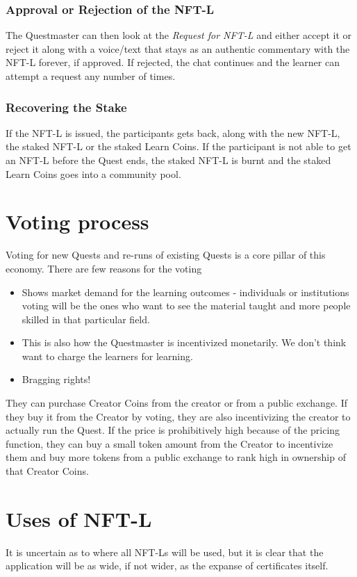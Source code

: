 \documentclass{article}
\begin{document}
        \subsubsection{Approval or Rejection of the NFT-L}
          The Questmaster can then look at the \textit{Request for NFT-L} and either accept it or reject it along with a voice/text that stays as an authentic commentary with the NFT-L forever, if approved. 
          If rejected, the chat continues and the learner can attempt a request any number of times.
        \subsubsection{Recovering the Stake}
          If the NFT-L is issued, the participants gets back, along with the new NFT-L, the staked NFT-L or the staked Learn Coins.
          \break
          If the participant is not able to get an NFT-L before the Quest ends, the staked NFT-L is burnt and the staked Learn Coins goes into a community pool.
  \section{Voting process}
    Voting for new Quests and re-runs of existing Quests is a core pillar of this economy. 
    There are few reasons for the voting
    \begin{itemize}
      \item Shows market demand for the learning outcomes - individuals or institutions voting will be the ones who want to see the material taught and more people skilled in that particular field.
      \item This is also how the Questmaster is incentivized monetarily. We don't think want to charge the learners for learning.
      \item Bragging rights!
    \end{itemize}
    They can purchase Creator Coins from the creator or from a public exchange. If they buy it from the Creator by voting, they are also incentivizing the creator to actually run the Quest.
    If the price is prohibitively high because of the pricing function, they can buy a small token amount from the Creator to incentivize them and buy more tokens from a public exchange to rank high in ownership of that Creator Coins.
  \section{Uses of NFT-L}
    It is uncertain as to where all NFT-Ls will be used, but it is clear that the application will be as wide, if not wider, as the expanse of certificates itself.
\end{document}
